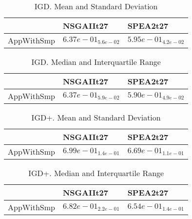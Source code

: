 \documentclass{article}
\begin{document}
\begin{table}
\caption{IGD. Mean and Standard Deviation}
\label{table: IGD}
\centering
\begin{scriptsize}
\begin{tabular}{lll}
\hline & NSGAIIt27 &  SPEA2t27\\
\hline 
AppWithSmp & \cellcolor{gray25}$  6.37e-01_{ 5.6e-02}$ & \cellcolor{gray95}$  5.95e-01_{ 4.2e-02}$ \\
\hline
\end{tabular}
\end{scriptsize}
\end{table}

\begin{table}
\caption{IGD. Median and Interquartile Range}
\label{table: IGD}
\centering
\begin{scriptsize}
\begin{tabular}{lll}
\hline & NSGAIIt27 &  SPEA2t27\\
\hline 
AppWithSmp & \cellcolor{gray25}$  6.37e-01_{ 5.9e-02}$ & \cellcolor{gray95}$  5.90e-01_{ 4.9e-02}$ \\
\hline
\end{tabular}
\end{scriptsize}
\end{table}

\begin{table}
\caption{IGD+. Mean and Standard Deviation}
\label{table: IGD+}
\centering
\begin{scriptsize}
\begin{tabular}{lll}
\hline & NSGAIIt27 &  SPEA2t27\\
\hline 
AppWithSmp & \cellcolor{gray25}$  6.99e-01_{ 1.4e-01}$ & \cellcolor{gray95}$  6.69e-01_{ 1.1e-01}$ \\
\hline
\end{tabular}
\end{scriptsize}
\end{table}

\begin{table}
\caption{IGD+. Median and Interquartile Range}
\label{table: IGD+}
\centering
\begin{scriptsize}
\begin{tabular}{lll}
\hline & NSGAIIt27 &  SPEA2t27\\
\hline 
AppWithSmp & \cellcolor{gray25}$  6.82e-01_{ 2.2e-01}$ & \cellcolor{gray95}$  6.54e-01_{ 1.4e-01}$ \\
\hline
\end{tabular}
\end{scriptsize}
\end{table}
\end{document}

